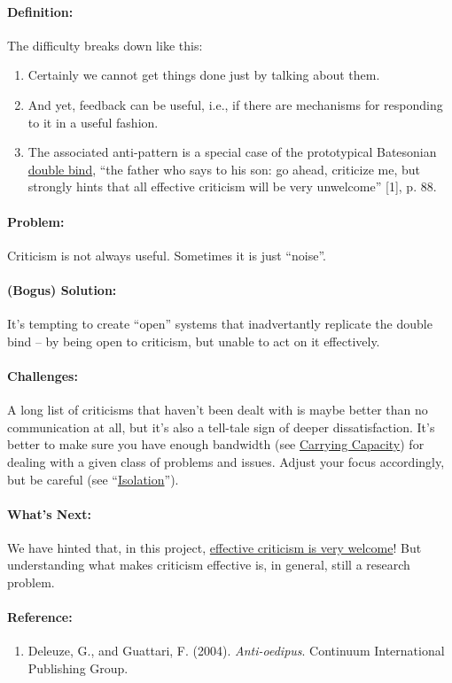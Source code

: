 \paragraph{Definition:} The difficulty breaks down like this:

\begin{enumerate}
\item
  Certainly we cannot get things done just by talking about them.
\item
  And yet, feedback can be useful, i.e., if there are mechanisms for
  responding to it in a useful fashion.
\item
  The associated anti-pattern is a special case of the prototypical
  Batesonian \href{http://en.wikipedia.org/wiki/Double_bind}{double
  bind}, ``the father who says to his son: go ahead, criticize me, but
  strongly hints that all effective criticism will be very unwelcome''
  {[}1{]}, p. 88.
\end{enumerate}

\paragraph{Problem:} Criticism is not always useful. Sometimes it is just
``noise''.

\paragraph{(Bogus) Solution:} It's tempting to create ``open'' systems that
inadvertantly replicate the double bind -- by being open to criticism,
but unable to act on it effectively.

\paragraph{Challenges:} A long list of criticisms that haven't been dealt
with is maybe better than no communication at all, but it's also a
tell-tale sign of deeper dissatisfaction. It's better to make sure you
have enough bandwidth (see
\href{http://peeragogy.org/patterns-usecases/patterns-and-heuristics/carrying-capacity/}{Carrying
Capacity}) for dealing with a given class of problems and issues. Adjust
your focus accordingly, but be careful (see
``\href{http://peeragogy.org/antipatterns/isolation/}{Isolation}'').

\paragraph{What's Next:} We have hinted that, in this project,
\href{http://peeragogy.org/how-to-use-this-handbook/}{effective
criticism is very welcome}! But understanding what makes criticism
effective is, in general, still a research problem.

\paragraph{Reference:}

\begin{enumerate}
\itemsep1pt\parskip0pt
\item
  Deleuze, G., and Guattari, F. (2004). \emph{Anti-oedipus}. Continuum
  International Publishing Group.
\end{enumerate}
